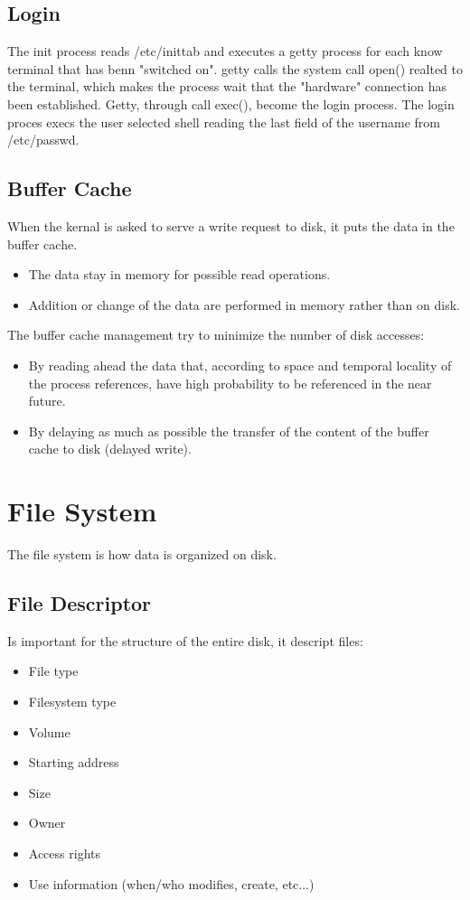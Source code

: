 \documentclass[12pt]{article}
\begin{document}
\subsection{Login}
The init process reads /etc/inittab and executes a getty process for each know terminal that has benn "switched on". getty calls the system call open() realted to the terminal, which makes the process wait that the "hardware" connection has been established. Getty, through call exec(), become the login process. The login proces execs the user selected shell reading the last field of the username from /etc/passwd.

\subsection{Buffer Cache}
When the kernal is asked to serve a write request to disk, it puts the data in the buffer cache.
\begin{itemize}
  \item The data stay in memory for possible read operations.
  \item Addition or change of the data are performed in memory rather than on disk.
\end{itemize}
The buffer cache management try to minimize the number of disk accesses:
\begin{itemize}
  \item By reading ahead the data that, according to space and temporal locality of the process references, have high probability to be referenced in the near future.
  \item By delaying as much as possible the transfer of the content of the buffer cache to disk (delayed write).
\end{itemize}

\section{File System}
The file system is how data is organized on disk.
\subsection{File Descriptor}
Is important for the structure of the entire disk, it descript files:
\begin{itemize}
  \item File type
  \item Filesystem type
  \item Volume
  \item Starting address
  \item Size
  \item Owner
  \item Access rights
  \item Use information (when/who modifies, create, etc...)
\end{itemize}
\end{document}

